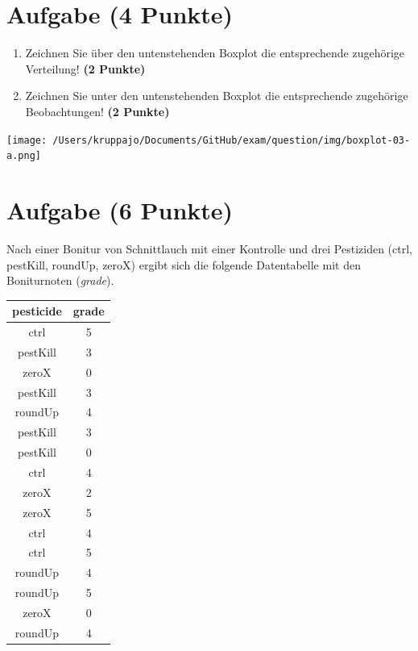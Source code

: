 \documentclass[a4paper, 10pt]{scrartcl}\usepackage[]{graphicx}\usepackage[]{xcolor}
\begin{document}
\section{Aufgabe \hfill (4 Punkte)}



\begin{enumerate}
\item Zeichnen Sie {\"u}ber den untenstehenden Boxplot die entsprechende
  zugeh{\"o}rige Verteilung! \textbf{(2 Punkte)} 
\item Zeichnen Sie unter den untenstehenden Boxplot die entsprechende
  zugeh{\"o}rige Beobachtungen! \textbf{(2 Punkte)}
\end{enumerate}

\vspace*{8cm}

\begin{center}
  \texttt{[image: /Users/kruppajo/Documents/GitHub/exam/question/img/boxplot-03-a.png]}
\end{center}



 
\clearpage

\section{Aufgabe \hfill (6 Punkte)}

Nach einer Bonitur von Schnittlauch mit einer Kontrolle und drei Pestiziden (ctrl, pestKill, roundUp, zeroX) ergibt sich die folgende Datentabelle mit den Boniturnoten (\textit{grade}). 

\begin{table}[!h]
\centering
\begin{tabular}{cc}
\toprule
pesticide & grade\\
\midrule
ctrl & 5\\
pestKill & 3\\
zeroX & 0\\
pestKill & 3\\
roundUp & 4\\
\addlinespace
pestKill & 3\\
pestKill & 0\\
ctrl & 4\\
zeroX & 2\\
zeroX & 5\\
\addlinespace
ctrl & 4\\
ctrl & 5\\
roundUp & 4\\
roundUp & 5\\
zeroX & 0\\
\addlinespace
roundUp & 4\\
\bottomrule
\end{tabular}
\end{table}
\end{document}
